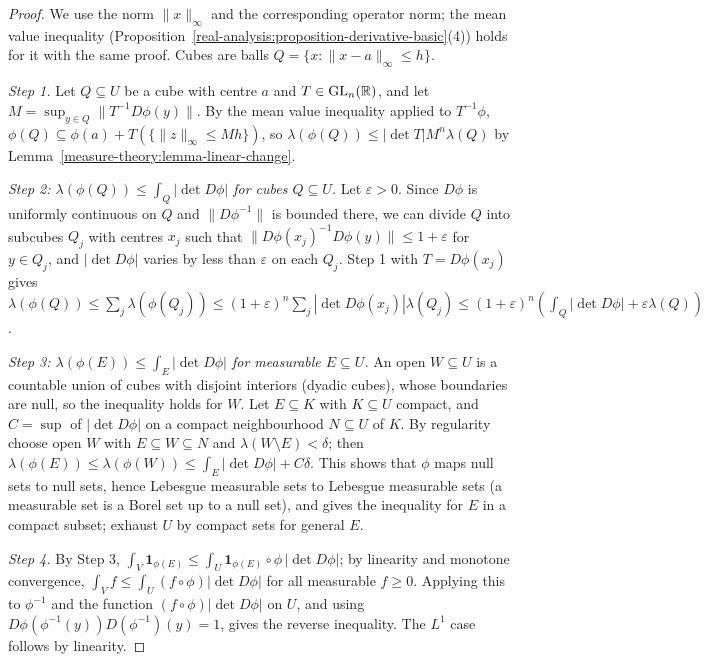 \begin{proof}
We use the norm $\|x\|_\infty$ and the corresponding operator norm; the mean value inequality (Proposition~\ref{real-analysis:proposition-derivative-basic}(4)) holds for it with the same proof. Cubes are balls
$Q = \{x : \|x - a\|_\infty \leq h\}$.

\emph{Step 1.} Let $Q \subseteq U$ be a cube with centre $a$ and $T \in \mathrm{GL}_n(\mathbb{R})$, and let $M = \sup_{y \in Q}\|T^{-1}D\phi(y)\|$. By the mean value inequality applied to $T^{-1}\phi$,
$\phi(Q) \subseteq \phi(a) + T(\{\|z\|_\infty \leq Mh\})$, so $\lambda(\phi(Q)) \leq |\det T|M^n\lambda(Q)$ by Lemma~\ref{measure-theory:lemma-linear-change}.

\emph{Step 2: $\lambda(\phi(Q)) \leq \int_Q|\det D\phi|$ for cubes $Q \subseteq U$.} Let $\varepsilon > 0$. Since $D\phi$ is uniformly continuous on $Q$ and $\|D\phi^{-1}\|$ is bounded there, we can divide $Q$ into
subcubes $Q_j$ with centres $x_j$ such that $\|D\phi(x_j)^{-1}D\phi(y)\| \leq 1 + \varepsilon$ for $y \in Q_j$, and $|\det D\phi|$ varies by less than $\varepsilon$ on each $Q_j$. Step 1 with $T = D\phi(x_j)$ gives
$\lambda(\phi(Q)) \leq \sum_j\lambda(\phi(Q_j)) \leq (1 + \varepsilon)^n\sum_j|\det D\phi(x_j)|\lambda(Q_j) \leq (1 + \varepsilon)^n(\int_Q|\det D\phi| + \varepsilon\lambda(Q))$.

\emph{Step 3: $\lambda(\phi(E)) \leq \int_E|\det D\phi|$ for measurable $E \subseteq U$.} An open $W \subseteq U$ is a countable union of cubes with disjoint interiors (dyadic cubes), whose boundaries are null, so the
inequality holds for $W$. Let $E \subseteq K$ with $K \subseteq U$ compact, and $C = \sup$ of $|\det D\phi|$ on a compact neighbourhood $N \subseteq U$ of $K$. By regularity choose open $W$ with $E \subseteq W \subseteq N$ and
$\lambda(W \setminus E) < \delta$; then $\lambda(\phi(E)) \leq \lambda(\phi(W)) \leq \int_E|\det D\phi| + C\delta$. This shows that $\phi$ maps null sets to null sets, hence Lebesgue measurable sets to
Lebesgue measurable sets (a measurable set is a Borel set up to a null set), and gives the inequality for $E$ in a compact subset; exhaust $U$ by compact sets for general $E$.

\emph{Step 4.} By Step 3, $\int_V\mathbf{1}_{\phi(E)} \leq \int_U\mathbf{1}_{\phi(E)} \circ \phi\,|\det D\phi|$; by linearity and monotone convergence, $\int_Vf \leq \int_U(f \circ \phi)|\det D\phi|$ for all measurable
$f \geq 0$. Applying this to $\phi^{-1}$ and the function $(f \circ \phi)|\det D\phi|$ on $U$, and using $D\phi(\phi^{-1}(y))D(\phi^{-1})(y) = 1$, gives the reverse inequality. The $L^1$ case follows by linearity.
\end{proof}

